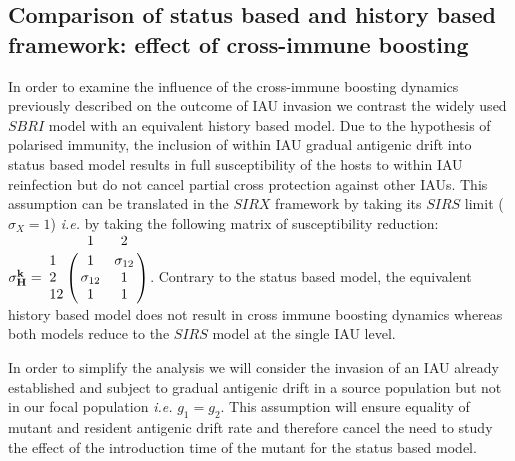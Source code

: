 \subsection{Comparison of status based and history based framework:
  effect of cross-immune boosting}

In order to examine the influence of the cross-immune boosting
dynamics previously described on the outcome of IAU invasion we
contrast the widely used $SBRI$ model with an equivalent history based
model.  Due to the hypothesis of polarised immunity, the inclusion of
within IAU gradual antigenic drift into status based model results in
full susceptibility of the hosts to within IAU reinfection but do not
cancel partial cross protection against other IAUs.  This assumption
can be translated in the $SIRX$ framework by taking its $SIRS$ limit
($\sigma_{X}=1$) \textit{i.e.} by taking the following matrix of
susceptibility reduction: $\mathbf{\sigma_H^k} = \bordermatrix{ & 1 &
  2\cr 1 & 1 & \sigma_{12} \cr 2 & \sigma_{12} & 1 \cr 12 & 1 & 1 \cr
}$. Contrary to the status based model, the equivalent history based
model does not result in cross immune boosting dynamics whereas both
models reduce to the $SIRS$ model at the single IAU level.

In order to simplify the analysis we will consider the invasion of an
IAU already established and subject to gradual antigenic drift in a
source population but not in our focal population \textit{i.e.}
$g_{1}=g_{2}$. This assumption will ensure equality of mutant and
resident antigenic drift rate and therefore cancel the need to study
the effect of the introduction time of the mutant for the status based
model.

